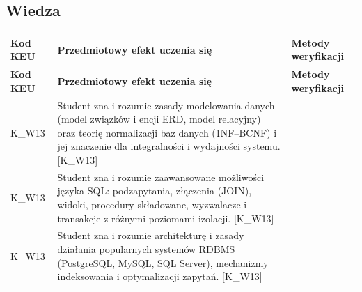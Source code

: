 \documentclass[12pt, a4paper]{article}
\newcommand{\thdrule}{\noalign{\global\setlength{\extrarowheight}{0pt}}}
\newcommand{\thdend}{\noalign{\global\setlength{\extrarowheight}{3pt}}}
\begin{document}
\subsection*{Wiedza}
{\scriptsize
\begin{longtable}{m{1.6cm}m{9.0cm}m{4.2cm}}
\thdrule\toprule
\rowcolor{pjatkRed} {\color{white}\footnotesize\textbf{\vphantom{Ag}Kod KEU}} & {\color{white}\footnotesize\textbf{\vphantom{Ag}Przedmiotowy efekt uczenia się}} & {\color{white}\footnotesize\textbf{\vphantom{Ag}Metody weryfikacji}} \\
\midrule\thdend
\endfirsthead
\thdrule\toprule
\rowcolor{pjatkRed} {\color{white}\footnotesize\textbf{\vphantom{Ag}Kod KEU}} & {\color{white}\footnotesize\textbf{\vphantom{Ag}Przedmiotowy efekt uczenia się}} & {\color{white}\footnotesize\textbf{\vphantom{Ag}Metody weryfikacji}} \\
\midrule\thdend
\endhead
  \rowcolor{tableRowLight} K\_W13 & Student zna i rozumie zasady modelowania danych (model związków i encji ERD, model relacyjny) oraz teorię normalizacji baz danych (1NF–BCNF) i jej znaczenie dla integralności i wydajności systemu. {[}K\_W13{]} &  \\
  \rowcolor{tableRowAlt} K\_W13 & Student zna i rozumie zaawansowane możliwości języka SQL: podzapytania, złączenia (JOIN), widoki, procedury składowane, wyzwalacze i transakcje z różnymi poziomami izolacji. {[}K\_W13{]} &  \\
  \rowcolor{tableRowLight} K\_W13 & Student zna i rozumie architekturę i zasady działania popularnych systemów RDBMS (PostgreSQL, MySQL, SQL Server), mechanizmy indeksowania i optymalizacji zapytań. {[}K\_W13{]} &  \\
\bottomrule
\end{longtable}}
\end{document}
